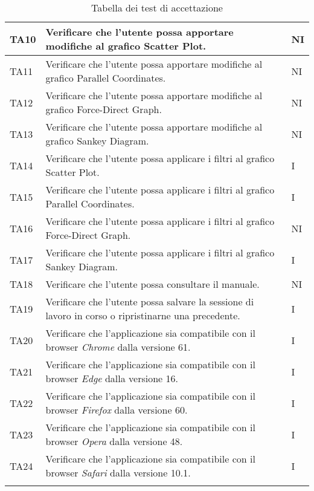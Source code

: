 \begin{center}
\begin{longtable}{|p{1.5cm}|p{11cm}|p{1cm}|}
                \rowcolor[HTML]{C0C0C0}
                TA10 & Verificare che l’utente possa apportare modifiche al grafico Scatter Plot. & NI\\ \hline
                \rowcolor[HTML]{EFEFEF}
                TA11 & Verificare che l’utente possa apportare modifiche al grafico Parallel Coordinates. & NI\\ \hline
                \rowcolor[HTML]{C0C0C0}
                TA12 & Verificare che l’utente possa apportare modifiche al grafico Force-Direct Graph. & NI\\ \hline
                \rowcolor[HTML]{EFEFEF}
                TA13 & Verificare che l’utente possa apportare modifiche al grafico Sankey Diagram. & NI\\ \hline
                \rowcolor[HTML]{C0C0C0}
                TA14 & Verificare che l’utente possa applicare i filtri al grafico Scatter Plot. & I\\ \hline
                \rowcolor[HTML]{EFEFEF}
                TA15 & Verificare che l’utente possa applicare i filtri al grafico Parallel Coordinates. & I\\ \hline
                \rowcolor[HTML]{C0C0C0}
                TA16 & Verificare che l’utente possa applicare i filtri al grafico Force-Direct Graph. & NI\\ \hline
                \rowcolor[HTML]{EFEFEF}
                TA17 & Verificare che l’utente possa applicare i filtri al grafico Sankey Diagram. & I\\ \hline
                \rowcolor[HTML]{C0C0C0}
                TA18 & Verificare che l’utente possa consultare il manuale. & NI\\ \hline
                \rowcolor[HTML]{EFEFEF}
                TA19 & Verificare che l’utente possa salvare la sessione di lavoro in corso o ripristinarne una precedente. & I\\ \hline
                \rowcolor[HTML]{C0C0C0}
                TA20 & Verificare che l'applicazione sia compatibile con il browser \textit{Chrome} dalla versione 61. & I\\ \hline
                \rowcolor[HTML]{EFEFEF}
                TA21 & Verificare che l'applicazione sia compatibile con il browser \textit{Edge} dalla versione 16. & I\\ \hline
                \rowcolor[HTML]{C0C0C0}
                TA22 & Verificare che l'applicazione sia compatibile con il browser \textit{Firefox} dalla versione 60. & I\\ \hline
                \rowcolor[HTML]{EFEFEF}
                TA23 & Verificare che l'applicazione sia compatibile con il browser \textit{Opera} dalla versione 48. & I\\ \hline
                \rowcolor[HTML]{C0C0C0}
                TA24 & Verificare che l'applicazione sia compatibile con il browser \textit{Safari} dalla versione 10.1. & I\\ \hline
                \caption{Tabella dei test di accettazione}
            \end{longtable}
        \end{center}

